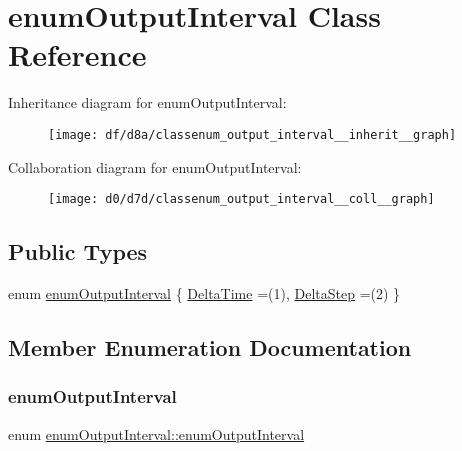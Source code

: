 \hypertarget{classenum_output_interval}{}\section{enum\+Output\+Interval Class Reference}
\label{classenum_output_interval}


Inheritance diagram for enum\+Output\+Interval\+:
\nopagebreak
\begin{figure}[H]
\begin{center}
\leavevmode
\texttt{[image: df/d8a/classenum\_output\_interval\_\_inherit\_\_graph]}
\end{center}
\end{figure}


Collaboration diagram for enum\+Output\+Interval\+:
\nopagebreak
\begin{figure}[H]
\begin{center}
\leavevmode
\texttt{[image: d0/d7d/classenum\_output\_interval\_\_coll\_\_graph]}
\end{center}
\end{figure}
\subsection*{Public Types}
\begin{DoxyCompactItemize}
\item 
enum \hyperlink{classenum_output_interval_afd8c4d883087ef13be57b8f21a2ef059}{enum\+Output\+Interval} \{ \hyperlink{classenum_output_interval_afd8c4d883087ef13be57b8f21a2ef059ad8c02b76902ad1705325f7ff897d8624}{Delta\+Time} =(1), 
\hyperlink{classenum_output_interval_afd8c4d883087ef13be57b8f21a2ef059af9f005e8e6083a79e907f48bda83ba59}{Delta\+Step} =(2)
 \}
\end{DoxyCompactItemize}


\subsection{Member Enumeration Documentation}
\mbox{\label{classenum_output_interval_afd8c4d883087ef13be57b8f21a2ef059}} 
\subsubsection{\texorpdfstring{enum\+Output\+Interval}{enumOutputInterval}}
{\footnotesize\ttfamily enum \hyperlink{classenum_output_interval_afd8c4d883087ef13be57b8f21a2ef059}{enum\+Output\+Interval\+::enum\+Output\+Interval}}

